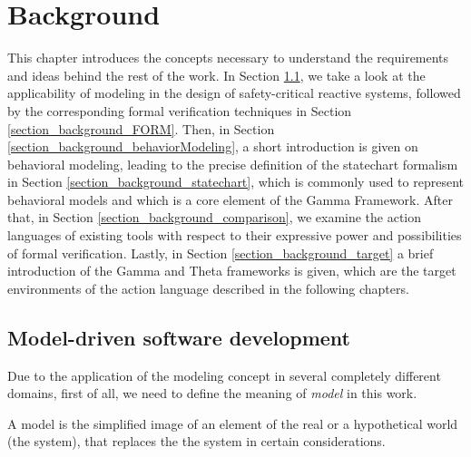 \chapter{Background} \label{chapter_background}
This chapter introduces the concepts necessary to understand the requirements and ideas behind the rest of the work. In Section \ref{section_background_MDSD}, we take a look at the applicability of modeling in the design of safety-critical reactive systems, followed by the corresponding formal verification techniques in Section \ref{section_background_FORM}. Then, in Section \ref{section_background_behaviorModeling}, a short introduction is given on behavioral modeling, leading to the precise definition of the statechart formalism in  Section \ref{section_background_statechart}, which is commonly used to represent behavioral models and which is a core element of the Gamma Framework. After that, in Section \ref{section_background_comparison}, we examine the action languages of existing tools with respect to their expressive power and possibilities of formal verification. Lastly, in Section \ref{section_background_target} a brief introduction of the Gamma and Theta frameworks is given, which are the target environments of the action language described in the following chapters. 

\section{Model-driven software development} \label{section_background_MDSD}
Due to the application of the modeling concept in several completely different domains, first of all, we need to define the meaning of \textit{model} in this work.
\begin{definition}[Model]
	A model is the simplified image of an element of the real or a hypothetical world (the system), that replaces the the system in certain considerations.
\end{definition}

